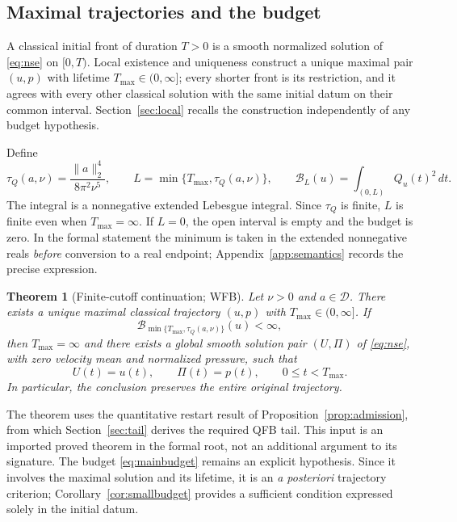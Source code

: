 \documentclass[11pt,a4paper]{article}
\numberwithin{equation}{section}
\theoremstyle{plain}
\newtheorem{theorem}{Theorem}[section]
\theoremstyle{definition}
\theoremstyle{remark}
\newcommand{\D}{\mathcal D}
\newcommand{\norm}[2]{\lVert #1\rVert_{#2}}
\newcommand{\Tmax}{T_{\max}}
\newcommand{\tq}{\tau_Q}
\newcommand{\Budget}{\mathcal B}
\begin{document}
\subsection{Maximal trajectories and the budget}
A classical initial front of duration $T>0$ is a smooth normalized solution
of \eqref{eq:nse} on $[0,T)$. Local existence and uniqueness construct a
unique maximal pair $(u,p)$ with lifetime $\Tmax\in(0,\infty]$; every shorter
front is its restriction, and it agrees with every other classical solution
with the same initial datum on their common interval. Section~\ref{sec:local}
recalls the construction independently of any budget hypothesis.

Define
\begin{equation}\label{eq:cutoff}
 \tq(a,\nu)=\frac{\norm{a}{2}^4}{8\pi^2\nu^5},
 \qquad L=\min\{\Tmax,\tq(a,\nu)\},
 \qquad \Budget_L(u)=\int_{(0,L)}Q_u(t)^2\,dt.
\end{equation}
The integral is a nonnegative extended Lebesgue integral. Since $\tq$ is
finite, $L$ is finite even when $\Tmax=\infty$. If $L=0$, the open interval
is empty and the budget is zero. In the formal statement the minimum is
taken in the extended nonnegative reals \emph{before} conversion to a real
endpoint; Appendix~\ref{app:semantics} records the precise expression.

\begin{theorem}[Finite-cutoff continuation; WFB]\label{thm:wfb}
Let $\nu>0$ and $a\in\D$. There exists a unique maximal classical trajectory
$(u,p)$ with $\Tmax\in(0,\infty]$. If
\begin{equation}\label{eq:mainbudget}
 \Budget_{\min\{\Tmax,\tq(a,\nu)\}}(u)<\infty,
\end{equation}
then $\Tmax=\infty$ and there exists a global smooth solution pair $(U,\Pi)$ of
\eqref{eq:nse}, with zero velocity mean and normalized pressure, such that
\begin{equation}\label{eq:preservation}
 U(t)=u(t),\qquad \Pi(t)=p(t),\qquad 0\le t<\Tmax.
\end{equation}
In particular, the conclusion preserves the entire original trajectory.
\end{theorem}

The theorem uses the quantitative restart result of
Proposition~\ref{prop:admission}, from which Section~\ref{sec:tail} derives
the required QFB tail. This input is an imported proved theorem in the
formal root, not an additional argument to its signature. The budget
\eqref{eq:mainbudget} remains an explicit hypothesis. Since it involves
the maximal solution and its lifetime, it is an \emph{a posteriori}
trajectory criterion; Corollary~\ref{cor:smallbudget} provides a sufficient
condition expressed solely in the initial datum.
\end{document}
